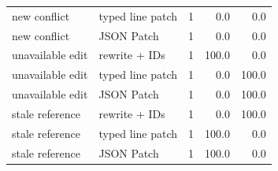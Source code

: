 \begin{tabular}{llrrr}
new conflict & typed line patch & 1 & 0.0 & 0.0 \\
new conflict & JSON Patch & 1 & 0.0 & 0.0 \\
unavailable edit & rewrite + IDs & 1 & 100.0 & 0.0 \\
unavailable edit & typed line patch & 1 & 0.0 & 100.0 \\
unavailable edit & JSON Patch & 1 & 0.0 & 100.0 \\
stale reference & rewrite + IDs & 1 & 0.0 & 100.0 \\
stale reference & typed line patch & 1 & 100.0 & 0.0 \\
stale reference & JSON Patch & 1 & 100.0 & 0.0 \\
\bottomrule
\end{tabular}
